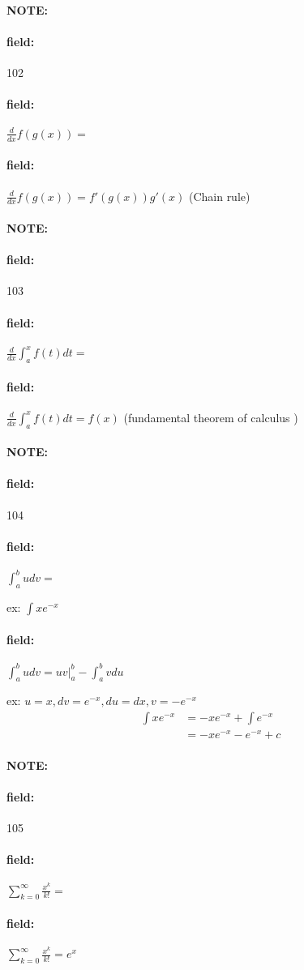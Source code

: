 \documentclass[12pt]{article}
\newenvironment{note}{\paragraph{NOTE:}}{}
\newenvironment{field}{\paragraph{field:}}{}
\begin{document}
\begin{note} \begin{field} \tiny 102 \end{field}
  \begin{field}
    $\frac{d}{dx}f(g(x)) = $
  \end{field}
  \begin{field}
    $\frac{d}{dx}f(g(x)) = f'(g(x))g'(x)$ (Chain rule)
  \end{field}
\end{note}

\begin{note} \begin{field} \tiny 103 \end{field}
  \begin{field}
    $\frac{d}{dx} \int_{a}^x f(t)dt = $
  \end{field}
  \begin{field}
    $\frac{d}{dx} \int_{a}^x f(t)dt = f(x)$ (fundamental theorem of calculus )
  \end{field}
\end{note}


\begin{note} \begin{field} \tiny 104 \end{field}
  \begin{field}
    $\int_a^b u dv = $

    ex: $\int x e^{-x}$
  \end{field}
  \begin{field}
    $\int_a^b u dv = uv|_a^b - \int_a^b v du $

    ex: $u = x, dv = e^{-x}, du = dx, v = -e^{-x}$
    \begin{align*}
      \int x e^{-x} &= -x e^{-x} + \int e^{-x} \\
      &= -x e^{-x}  -e^{-x} + c
    \end{align*}
  \end{field}
\end{note}

\begin{note} \begin{field} \tiny 105 \end{field}
  \begin{field}
    $\sum_{k=0}^\infty \frac{x^k}{k!} = $
  \end{field}
  \begin{field}
    $\sum_{k=0}^\infty \frac{x^k}{k!} = e^x$
  \end{field}
\end{note}
\end{document}
